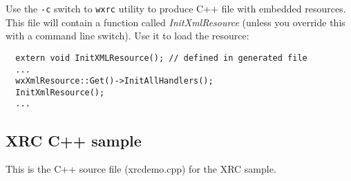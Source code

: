 Use the {\tt -c} switch to
{\tt wxrc} utility to produce C++ file with embedded resources. This file will
contain a function called {\it InitXmlResource} (unless you override this with
a command line switch). Use it to load the resource:
\begin{verbatim}
  extern void InitXMLResource(); // defined in generated file
  ...
  wxXmlResource::Get()->InitAllHandlers();
  InitXmlResource();
  ...
\end{verbatim}

\subsection{XRC C++ sample}\label{xrccppsample}

This is the C++ source file (xrcdemo.cpp) for the XRC sample.

